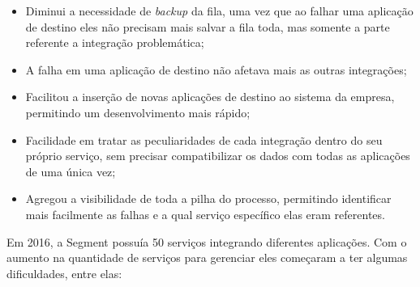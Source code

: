 \begin{itemize}
    \item Diminui a necessidade de \textit{backup} da fila, uma vez que ao falhar uma aplicação de
        destino eles não precisam mais salvar a fila toda, mas somente a parte referente a
        integração problemática;
    \item A falha em uma aplicação de destino não afetava mais as outras integrações;
    \item Facilitou a inserção de novas aplicações de destino ao sistema da empresa, permitindo um
        desenvolvimento mais rápido;
    \item Facilidade em tratar as peculiaridades de cada integração dentro do seu próprio serviço,
        sem precisar compatibilizar os dados com todas as aplicações de uma única vez;
    \item Agregou a visibilidade de toda a pilha do processo, permitindo identificar mais facilmente
        as falhas e a qual serviço específico elas eram referentes.
\end{itemize}

Em 2016, a Segment possuía 50 serviços integrando diferentes aplicações. Com o aumento na quantidade
de serviços para gerenciar eles começaram a ter algumas dificuldades, entre elas:

